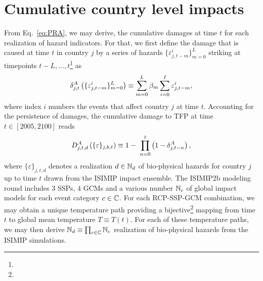 \documentclass[preprint,3p,authoryear]{elsarticle}
\begin{document}
\section{Cumulative country level impacts}
From Eq.~\eqref{eq:PRA}, we may derive, the cumulative damages at time $t$
for each realization of hazard indicators. For that, we first define the damage that is caused at time $t$ in country $j$ by a series of hazards $\lbrace \varepsilon_{j,t-m}^i\rbrace_{m=0}^L$ striking at timepoints  $t-L,\ldots,t$\footnote{} as   
\begin{equation}
  \label{eq:dA}
  \delta^A_{j,t}\left(\lbrace \varepsilon_{j,t-m}^i\rbrace_{m=0}^L\right)\equiv \sum_{m=0}^L\beta_m\sum_{i=0}^I\varepsilon_{j,t-m}^i,
\end{equation}
where index $i$ numbers the events that affect country $j$ at time $t$. Accounting for the persistence of damages, the cumulative damage to TFP at time $t\in[2005,2100]$ reads
\begin{equation}
  \label{eq:dA}
  \DA_{j,t,d}\left(\lbrace \varepsilon\rbrace_{j,b,t}\right)\equiv 1 - \ \prod_{n=0}^{t}\left(1-\dA_{j,t-n}\right),
\end{equation}
where $\lbrace \varepsilon\rbrace_{j,t,d}$ denotes a realization $d\in\mathbb{N}_d$ of bio-physical hazards for country $j$ up to time $t$ drawn from the ISIMIP impact ensemble. The ISIMIP2b modeling round includes $3$ SSPs, $4$ GCMs and a various number $\mathbb{N}_c$ of global impact models for each event category $c\in\mathbb{C}$. For each RCP-SSP-GCM combination, we may obtain a unique temperature path providing a bijective\footnote{} mapping from time $t$ to global mean temperature $T\equiv T(t)$. For each of these temperature paths, we may then derive $\mathbb{N}_d\equiv \prod_{c\in\mathbb{C}} \mathbb{N}_c$ realization of bio-physical hazards from the  ISIMIP simulations.
\end{document}
